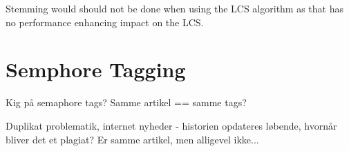 Stemming would should not be done when using the LCS algorithm as that has no performance enhancing impact on the LCS.

\section{Semphore Tagging}

Kig på semaphore tags? Samme artikel == samme tags?

Duplikat problematik, internet nyheder - historien opdateres løbende, hvornår bliver det et plagiat? Er samme artikel, men alligevel ikke...


